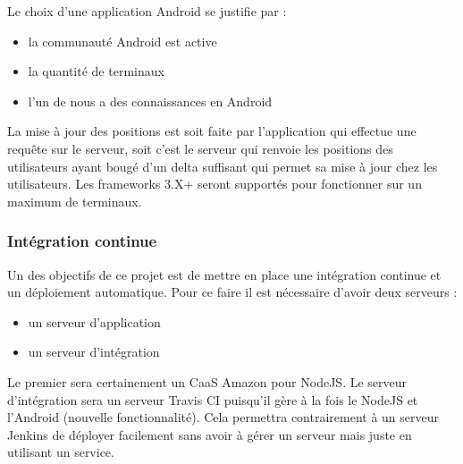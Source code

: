 Le choix d'une application Android se justifie par :
\begin{itemize}
    \item la communauté Android est active
    \item la quantité de terminaux
    \item l'un de nous a des connaissances en Android
\end{itemize}
La mise à jour des positions est soit faite par l'application qui effectue une requête sur le serveur, soit c'est le serveur qui renvoie les positions des utilisateurs ayant bougé d'un delta suffisant qui permet sa mise à jour chez les utilisateurs. Les frameworks 3.X+ seront supportés pour fonctionner sur un maximum de terminaux.


\subsubsection{Intégration continue}
Un des objectifs de ce projet est de mettre en place une intégration continue et un déploiement automatique. Pour ce faire il est nécessaire d'avoir deux serveurs :
\begin{itemize}
    \item un serveur d'application
    \item un serveur d'intégration
\end{itemize}

Le premier sera certainement un CaaS Amazon pour NodeJS. Le serveur d'intégration sera un serveur Travis CI puisqu'il gère à la fois le NodeJS et l'Android (nouvelle fonctionnalité). Cela permettra contrairement à un serveur Jenkins de déployer facilement sans avoir à gérer un serveur mais juste en utilisant un service.